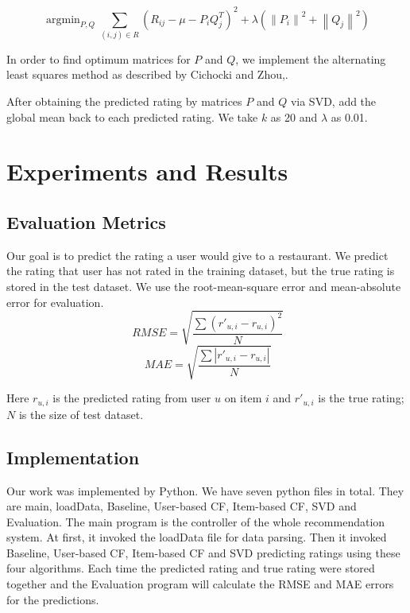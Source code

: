 \documentclass{llncs}
\DeclareMathOperator*{\argmin}{argmin}
\begin{document}
\begin{equation}
\argmin_{P,Q}\sum_{(i,j)\in{R}}{(R_{ij} - \mu - P_iQ_{j}^{T})}^2 + \lambda({\left\|P_i\right\|}^2 + {\left\|Q_j\right\|}^2 )
\end{equation}

In order to find optimum matrices for $P$ and $Q$, we implement the alternating least squares method as described by Cichocki and Zhou\cite{abc},\cite{zhou}.

After obtaining the predicted rating by matrices $P$ and $Q$ via SVD, add the global mean back to each predicted rating. We take $k$ as 20 and $\lambda$ as 0.01.


\section{Experiments and Results}
%
\subsection{Evaluation Metrics}
Our goal is to predict the rating a user would give to a restaurant. We predict the rating that user has not rated in the training dataset, but the true rating is stored in the test dataset. We use the root-mean-square error and mean-absolute error for evaluation.
\begin{equation}
\ RMSE = \sqrt{\frac{\sum{\left(r'_{u,i} - r_{u,i}\right)}^2}{N}}
\end{equation}
\begin{equation}
\ MAE = \sqrt{\frac{\sum{\left|r'_{u,i} - r_{u,i}\right|}}{N}}
\end{equation}

Here $r_{u,i}$ is the predicted rating from user $u$ on item $i$ and $r'_{u,i}$ is the true rating; $N$ is the size of test dataset. 
\subsection{Implementation}
Our work was implemented by Python. We have seven python files in total. They are main, loadData, Baseline, User-based CF, Item-based CF, SVD and Evaluation. The main program is the controller of the whole recommendation system. At first, it invoked the loadData file for data parsing. Then it invoked Baseline, User-based CF, Item-based CF and SVD predicting ratings using these four algorithms. Each time the predicted rating and true rating were stored together and the Evaluation program will calculate the RMSE and MAE errors for the predictions. 
\end{document}

